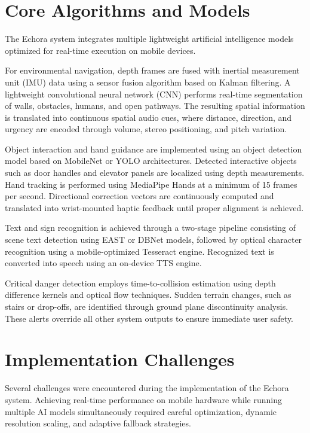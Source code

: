 \section{Core Algorithms and Models}

The Echora system integrates multiple lightweight artificial intelligence models optimized for real-time execution on mobile devices.

For environmental navigation, depth frames are fused with inertial measurement unit (IMU) data using a sensor fusion algorithm based on Kalman filtering. A lightweight convolutional neural network (CNN) performs real-time segmentation of walls, obstacles, humans, and open pathways. The resulting spatial information is translated into continuous spatial audio cues, where distance, direction, and urgency are encoded through volume, stereo positioning, and pitch variation.

Object interaction and hand guidance are implemented using an object detection model based on MobileNet or YOLO architectures. Detected interactive objects such as door handles and elevator panels are localized using depth measurements. Hand tracking is performed using MediaPipe Hands at a minimum of 15 frames per second. Directional correction vectors are continuously computed and translated into wrist-mounted haptic feedback until proper alignment is achieved.

Text and sign recognition is achieved through a two-stage pipeline consisting of scene text detection using EAST or DBNet models, followed by optical character recognition using a mobile-optimized Tesseract engine. Recognized text is converted into speech using an on-device TTS engine.

Critical danger detection employs time-to-collision estimation using depth difference kernels and optical flow techniques. Sudden terrain changes, such as stairs or drop-offs, are identified through ground plane discontinuity analysis. These alerts override all other system outputs to ensure immediate user safety.



\section{Implementation Challenges}

Several challenges were encountered during the implementation of the Echora system. Achieving real-time performance on mobile hardware while running multiple AI models simultaneously required careful optimization, dynamic resolution scaling, and adaptive fallback strategies.

